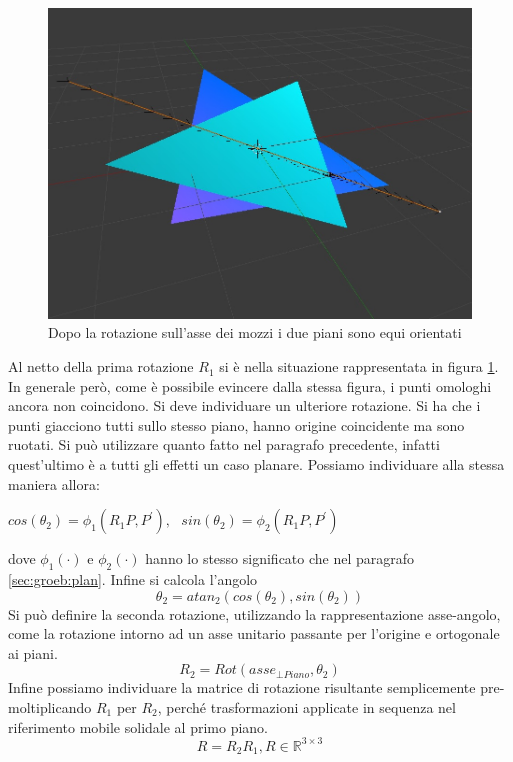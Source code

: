 \begin{figure}[h]
	\centering
	\includegraphics[width=420pt]{imgs/PianiSuStessoPiano.jpg}
	\caption{Dopo la rotazione sull'asse dei mozzi i due piani sono equi orientati}
	\label{rot:gb:samePlane}
\end{figure}

Al netto della prima rotazione $R_1$ si è nella situazione rappresentata in figura \ref{rot:gb:samePlane}. In generale però, come è possibile evincere dalla stessa figura, i punti omologhi ancora non coincidono. Si deve individuare un ulteriore rotazione.
Si ha che i punti giacciono tutti sullo stesso piano, hanno origine coincidente ma sono ruotati. Si può utilizzare quanto fatto nel paragrafo precedente, infatti quest'ultimo è a tutti gli effetti un caso planare.
Possiamo individuare alla stessa maniera allora:
\begin{center}
	$cos(\theta_2) = \phi_1(R_1P, P^{'}), \,\,$
	$sin(\theta_2) = \phi_2(R_1P, P^{'})$
\end{center} 
dove $\phi_1(\cdot)$ e $\phi_2(\cdot)$ hanno lo stesso significato che nel paragrafo \ref{sec:groeb:plan}. Infine si calcola l'angolo
\begin{equation}
	\theta_2 = atan_2(cos(\theta_2), sin(\theta_2))
\end{equation} 
Si può definire la seconda rotazione, utilizzando la rappresentazione asse-angolo, come la rotazione intorno ad un asse unitario passante per l'origine e ortogonale ai piani.
\begin{equation}
R_2 = Rot(asse_{\bot Piano}, \theta_2)
\end{equation} 
Infine possiamo individuare la matrice di rotazione risultante semplicemente pre-moltiplicando $R_1$ per $R_2$, perché trasformazioni applicate in sequenza nel riferimento mobile solidale al primo piano.
\begin{equation}
	R = R_2R_1, R \in \mathbb{R}^{3 \times 3}
\end{equation}


